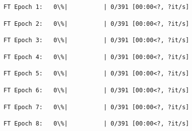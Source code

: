 \documentclass[11pt]{article}
\begin{document}
    
    
    \begin{Verbatim}[commandchars=\\\{\}]
FT Epoch 1:   0\%|          | 0/391 [00:00<?, ?it/s]
    \end{Verbatim}

    
    
    \begin{Verbatim}[commandchars=\\\{\}]
FT Epoch 2:   0\%|          | 0/391 [00:00<?, ?it/s]
    \end{Verbatim}

    
    
    \begin{Verbatim}[commandchars=\\\{\}]
FT Epoch 3:   0\%|          | 0/391 [00:00<?, ?it/s]
    \end{Verbatim}

    
    
    \begin{Verbatim}[commandchars=\\\{\}]
FT Epoch 4:   0\%|          | 0/391 [00:00<?, ?it/s]
    \end{Verbatim}

    
    
    \begin{Verbatim}[commandchars=\\\{\}]
FT Epoch 5:   0\%|          | 0/391 [00:00<?, ?it/s]
    \end{Verbatim}

    
    
    \begin{Verbatim}[commandchars=\\\{\}]
FT Epoch 6:   0\%|          | 0/391 [00:00<?, ?it/s]
    \end{Verbatim}

    
    
    \begin{Verbatim}[commandchars=\\\{\}]
FT Epoch 7:   0\%|          | 0/391 [00:00<?, ?it/s]
    \end{Verbatim}

    
    
    \begin{Verbatim}[commandchars=\\\{\}]
FT Epoch 8:   0\%|          | 0/391 [00:00<?, ?it/s]
    \end{Verbatim}
\end{document}
